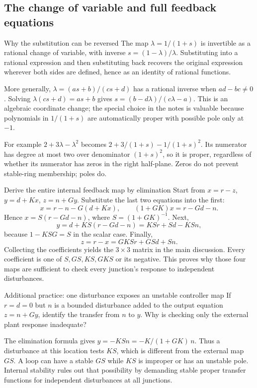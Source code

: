 \subsection{The change of variable and full feedback equations}
\begin{concept}{Why the substitution can be reversed}
The map $\lambda=1/(1+s)$ is invertible as a rational change of variable, with inverse $s=(1-\lambda)/\lambda$. Substituting into a rational expression and then substituting back recovers the original expression wherever both sides are defined, hence as an identity of rational functions.

More generally, $\lambda=(as+b)/(cs+d)$ has a rational inverse when $ad-bc\ne0$. Solving $\lambda(cs+d)=as+b$ gives $s=(b-d\lambda)/(c\lambda-a)$. This is an algebraic coordinate change; the special choice in the notes is valuable because polynomials in $1/(1+s)$ are automatically proper with possible pole only at $-1$.

For example $2+3\lambda-\lambda^2$ becomes $2+3/(1+s)-1/(1+s)^2$. Its numerator has degree at most two over denominator $(1+s)^2$, so it is proper, regardless of whether its numerator has zeros in the right half-plane. Zeros do not prevent stable-ring membership; poles do.
\end{concept}
\begin{method}{Derive the entire internal feedback map by elimination}
Start from $x=r-z$, $y=d+Kx$, $z=n+Gy$. Substitute the last two equations into the first:
\[x=r-n-G(d+Kx),\qquad(1+GK)x=r-Gd-n.\]
Hence $x=S(r-Gd-n)$, where $S=(1+GK)^{-1}$. Next,
\[y=d+KS(r-Gd-n)=KSr+Sd-KSn,\]
because $1-KSG=S$ in the scalar case. Finally,
\[z=r-x=GKSr+GSd+Sn.\]
Collecting the coefficients yields the $3\times3$ matrix in the main discussion. Every coefficient is one of $S,GS,KS,GKS$ or its negative. This proves why those four maps are sufficient to check every junction's response to independent disturbances.
\end{method}
\begin{question}{Additional practice: one disturbance exposes an unstable controller map}
If $r=d=0$ but $n$ is a bounded disturbance added to the output equation $z=n+Gy$, identify the transfer from $n$ to $y$. Why is checking only the external plant response inadequate?
\end{question}
\begin{answer}
The elimination formula gives $y=-KSn=-K/(1+GK)\,n$. Thus a disturbance at this location tests $KS$, which is different from the external map $GS$. A loop can have a stable $GS$ while $KS$ is improper or has an unstable pole. Internal stability rules out that possibility by demanding stable proper transfer functions for independent disturbances at all junctions.
\end{answer}

